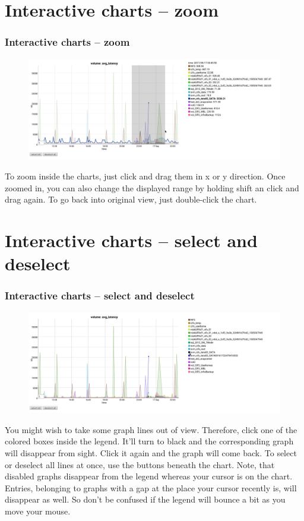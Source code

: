 \documentclass[8pt]{beamer}
\begin{document}
\section{Interactive charts -- zoom}
\begin{frame}
\frametitle{Interactive charts -- zoom} 
\begin{figure}
	\includegraphics[width=\textwidth]{../images/PicDat_zoomVertical.png}
\end{figure}

To zoom inside the charts, just click and drag them in x or y direction. Once zoomed in, you can also change the displayed range by holding shift an click and drag again. To go back into original view, just double-click the chart.
\end{frame}

\section{Interactive charts -- select and deselect}
\begin{frame}
\frametitle{Interactive charts -- select and deselect} 
\begin{figure}
	\includegraphics[width=\textwidth]{../images/PicDat_deselect.png}
\end{figure}

You might wish to take some graph lines out of view. Therefore, click one of the colored boxes inside the legend. It'll turn to black and the corresponding graph will disappear from sight. Click it again and the graph will come back. To select or deselect all lines at once, use the buttons beneath the chart.
Note, that disabled graphs disappear from the legend whereas your cursor is on the chart. Entries, belonging to graphs with a gap at the place your cursor recently is, will disappear as well. So don't be confused if the legend will bounce a bit as you move your mouse.
\end{frame}
\end{document}
